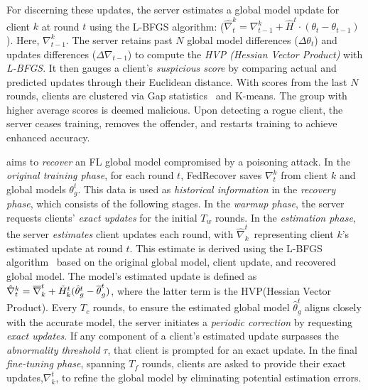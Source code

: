 For discerning these updates, the server estimates a global model update for client $k$ at round $t$ using the L-BFGS algorithm: ($\hat{\nabla}_{t}^{k} = \nabla_{t-1}^{k} + \hat{H}^{t}\cdot(\theta_{t} - \theta_{t-1})$). Here, $\nabla_{t-1}^{k}$. The server retains past $N$ global model differences ($\Delta \theta_{t}$) and updates differences ($\Delta \nabla_{t-1}$) to compute the \emph{HVP (Hessian Vector Product)} with \emph{L-BFGS}. It then gauges a client's \emph{suspicious score} by comparing actual and predicted updates through their Euclidean distance. With scores from the last $N$ rounds, clients are clustered via Gap statistics~\cite{tibshirani2001estimating} and K-means. The group with higher average scores is deemed malicious. Upon detecting a rogue client, the server ceases training, removes the offender, and restarts training to achieve enhanced accuracy.

\label{background:fdr}
aims to \emph{recover} an FL global model compromised by a poisoning attack. In the \emph{original training phase}, for each round $t$, FedRecover saves $\nabla^k_t$ from client $k$ and global models $\theta^t_g$. This data is used as \emph{historical information} in the \emph{recovery phase}, which consists of the following stages.
In the \emph{warmup phase}, the server requests clients' \emph{exact updates} for the initial $T_w$ rounds. In the \emph{estimation phase}, the server \emph{estimates} client updates each round, with $\hat{\nabla}^t_k$\ representing client $k$'s estimated update at round $t$. This estimate is derived using the L-BFGS algorithm~\cite{nocedal1980updating} based on the original global model, client update, and recovered global model. The model's estimated update is defined as $\hat{\nabla}^k_t = \overline{\nabla}^t_k + \Tilde{H}^t_k(\hat{\theta}^t_g - \overline{\theta}^t_g)$, where the latter term is the HVP(Hessian Vector Product).
Every $T_c$ rounds, to ensure the estimated global model $\hat{\theta}^t_g$ aligns closely with the accurate model, the server initiates a \emph{periodic correction} by requesting \emph{exact updates}. If any component of a client's estimated update surpasses the \emph{abnormality threshold} $\tau$, that client is prompted for an exact update.
In the final \emph{fine-tuning phase}, spanning $T_f$ rounds, clients are asked to provide their exact updates,$\nabla^t_k$, to refine the global model by eliminating potential estimation errors.



